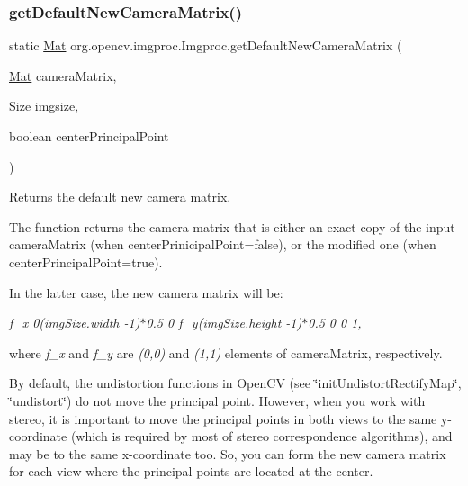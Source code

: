 \subsubsection{\texorpdfstring{get\+Default\+New\+Camera\+Matrix()}{getDefaultNewCameraMatrix()}\hspace{0.1cm}{\footnotesize\ttfamily [1/2]}}
{\footnotesize\ttfamily static \mbox{\hyperlink{classorg_1_1opencv_1_1core_1_1_mat}{Mat}} org.\+opencv.\+imgproc.\+Imgproc.\+get\+Default\+New\+Camera\+Matrix (\begin{DoxyParamCaption}\item[{\mbox{\hyperlink{classorg_1_1opencv_1_1core_1_1_mat}{Mat}}}]{camera\+Matrix,  }\item[{\mbox{\hyperlink{classorg_1_1opencv_1_1core_1_1_size}{Size}}}]{imgsize,  }\item[{boolean}]{center\+Principal\+Point }\end{DoxyParamCaption})\hspace{0.3cm}{\ttfamily [static]}}

Returns the default new camera matrix.

The function returns the camera matrix that is either an exact copy of the input {\ttfamily camera\+Matrix} (when {\ttfamily center\+Prinicipal\+Point=false}), or the modified one (when {\ttfamily center\+Principal\+Point=true}).

In the latter case, the new camera matrix will be\+:

{\itshape f\+\_\+x 0(img\+Size.\+width -\/1)$\ast$0.5 0 f\+\_\+y(img\+Size.\+height -\/1)$\ast$0.5 0 0 1,}

where {\itshape f\+\_\+x} and {\itshape f\+\_\+y} are {\itshape (0,0)} and {\itshape (1,1)} elements of {\ttfamily camera\+Matrix}, respectively.

By default, the undistortion functions in Open\+CV (see \char`\"{}init\+Undistort\+Rectify\+Map\char`\"{}, \char`\"{}undistort\char`\"{}) do not move the principal point. However, when you work with stereo, it is important to move the principal points in both views to the same y-\/coordinate (which is required by most of stereo correspondence algorithms), and may be to the same x-\/coordinate too. So, you can form the new camera matrix for each view where the principal points are located at the center.


